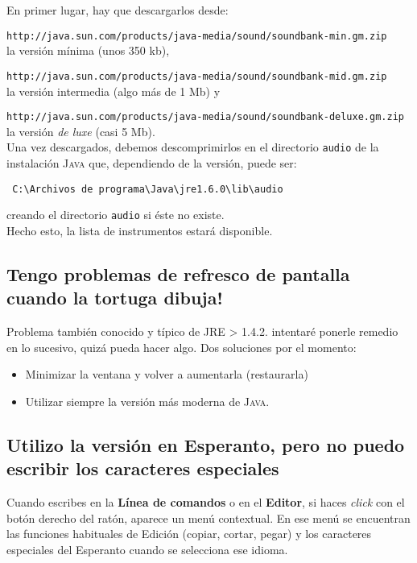 En primer lugar, hay que descargarlos desde:

\noindent
\texttt{http://java.sun.com/products/java-media/sound/soundbank-min.gm.zip} \\
la versi\'on m\'inima (unos 350 kb),

\noindent
\texttt{http://java.sun.com/products/java-media/sound/soundbank-mid.gm.zip} \\
la versi\'on intermedia (algo m\'as de 1 Mb) y

\noindent \texttt{http://java.sun.com/products/java-media/sound/soundbank-deluxe.gm.zip} \\
la versi\'on \textit{de luxe} (casi 5 Mb). \\

Una vez descargados, debemos descomprimirlos en el directorio \texttt{audio} de
la instalaci\'on \textsc{Java} que, dependiendo de la versi\'on, puede ser:
\begin{verbatim}
 C:\Archivos de programa\Java\jre1.6.0\lib\audio\end{verbatim}
creando el directorio \texttt{audio} si \'este no existe. \\

\noindent Hecho esto, la lista de instrumentos estar\'a disponible.

\subsection*{Tengo problemas de refresco de pantalla cuando la tortuga dibuja!}
   \label{Problemas-Refresco}

Problema tambi\'en conocido y t\'ipico de JRE > 1.4.2. intentar\'e ponerle
remedio en lo sucesivo, quiz\'a pueda hacer algo. Dos soluciones por
el momento:
\begin{itemize}
   \item Minimizar la ventana y volver a aumentarla (restaurarla)
   \item Utilizar siempre la versi\'on m\'as moderna de \textsc{Java}.
\end{itemize}

\subsection*{Utilizo la versi\'on en Esperanto, pero no puedo escribir los
            caracteres especiales}
   \label{Caracteres-Especiales-Esperanto}

Cuando escribes en la \textbf{L\'inea de comandos} o en el \textbf{Editor},
si haces \textit{click} con el bot\'on derecho del rat\'on, aparece un men\'u
contextual. En ese men\'u se encuentran las funciones habituales de Edici\'on
(copiar, cortar, pegar) y los caracteres especiales del Esperanto cuando se
selecciona ese idioma.

